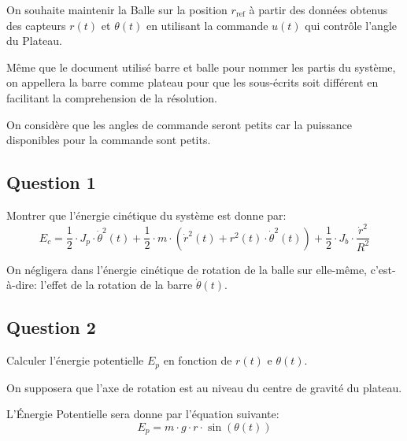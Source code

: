 \documentclass[class=article, crop=false]{standalone}
\begin{document}
On souhaite maintenir la Balle sur la position $r_{\text{ref}}$ à partir des données obtenus des capteurs $r(t)$ et $\theta(t)$ en utilisant la commande $u(t)$ qui contrôle l'angle du Plateau.
\begin{remark}
    Même que le document utilisé barre et balle pour nommer les partis du système, on appellera la barre comme plateau pour que les sous-écrits soit différent en facilitant la comprehension de la résolution.
\end{remark}
\begin{remark}
    On considère que les angles de commande seront petits car la puissance disponibles pour la commande sont petits.
\end{remark}

\subsection*{Question 1}
\begin{exercise}
    Montrer que l'énergie cinétique du système est donne par:
    \begin{equation}\label{eq:def_Ec}
        \boxed{
            E_c = 
            \frac{1}{2} \cdot J_p \cdot \dot{\theta}^2(t) +
            \frac{1}{2} \cdot m \cdot (\dot{r}^2(t) + r^2(t) \cdot \dot{\theta}^2(t)) +
            \frac{1}{2} \cdot J_b \cdot \frac{\dot{r}^2}{R^2}
        }
    \end{equation}
    \begin{remark}
        On négligera dans l'énergie cinétique de rotation de la balle sur elle-même, c'est-à-dire: l'effet de la rotation de la barre $\dot{\theta}(t)$.
    \end{remark}
\end{exercise}

\subsection*{Question 2}
\begin{exercise}
    Calculer l'énergie potentielle $E_p$ en fonction de $r(t)$ e $\theta(t)$.

    \begin{remark}
        On supposera que l'axe de rotation est au niveau du centre de gravité du plateau.
    \end{remark}
\end{exercise}
\begin{resolution}
    L'Énergie Potentielle sera donne par l'équation suivante:
    \begin{equation}\label{eq:def_Ep}
        \boxed{
            E_p = m \cdot g \cdot r \cdot \sin(\theta(t))
        }
    \end{equation}
\end{resolution}
\end{document}
